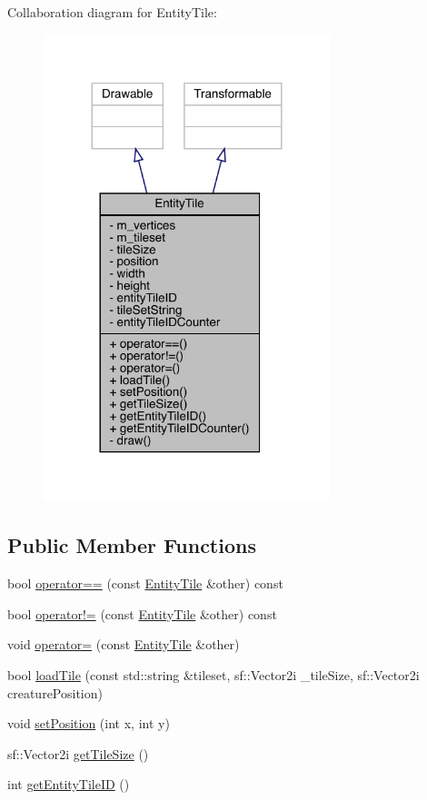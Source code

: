 Collaboration diagram for Entity\+Tile\+:
\nopagebreak
\begin{figure}[H]
\begin{center}
\leavevmode
\includegraphics[width=236pt]{class_entity_tile__coll__graph}
\end{center}
\end{figure}
\subsection*{Public Member Functions}
\begin{DoxyCompactItemize}
\item 
bool \mbox{\hyperlink{class_entity_tile_a2b8c81d35530991c08ca2b6a76e436bf}{operator==}} (const \mbox{\hyperlink{class_entity_tile}{Entity\+Tile}} \&other) const
\item 
bool \mbox{\hyperlink{class_entity_tile_ad5adfda10fac26073effad1f16d6ffb6}{operator!=}} (const \mbox{\hyperlink{class_entity_tile}{Entity\+Tile}} \&other) const
\item 
void \mbox{\hyperlink{class_entity_tile_a81dbf6b294b80d6edcc830a243cdfae8}{operator=}} (const \mbox{\hyperlink{class_entity_tile}{Entity\+Tile}} \&other)
\item 
bool \mbox{\hyperlink{class_entity_tile_a1a6b6b995ad942e7850f14cc6e693bbc}{load\+Tile}} (const std\+::string \&tileset, sf\+::\+Vector2i \+\_\+tile\+Size, sf\+::\+Vector2i creature\+Position)
\item 
void \mbox{\hyperlink{class_entity_tile_a7b9e5be8dc4017eb5af8e4fda7add3c4}{set\+Position}} (int x, int y)
\item 
sf\+::\+Vector2i \mbox{\hyperlink{class_entity_tile_a5b0c178bfb2b65842c9c70ffafd857a7}{get\+Tile\+Size}} ()
\item 
int \mbox{\hyperlink{class_entity_tile_a2a4d57fa026ee00140e4cfd4ccc0d2b0}{get\+Entity\+Tile\+ID}} ()
\end{DoxyCompactItemize}
